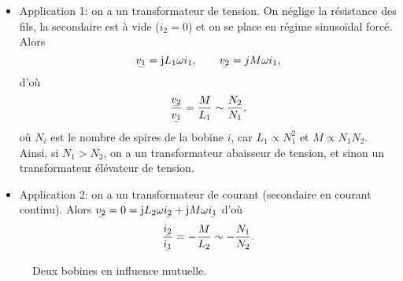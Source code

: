 \begin{itemize}
    \item Application 1: on a un transformateur de tension. On néglige la résistance des fils, la secondaire est à vide ($i_2=0$) et on se place en régime sinusoïdal forcé. Alors
    \begin{equation*}
        \ubar{v_1}=\rmj L_1\omega i_1,\qquad \ubar{v_2}=j M\omega i_1,
    \end{equation*}
    d'où
    \begin{equation*}
        \frac{\ubar{v_2}}{\ubar{v_1}}=\frac{M}{L_1}\sim\frac{N_2}{N_1},
    \end{equation*}
    où $N_i$ est le nombre de spires de la bobine $i$, car $L_1\propto N_1^{2}$ et $M\propto N_1 N_2$. Ainsi, si $N_1>N_2$, on a un transformateur abaisseur de tension, et sinon un transformateur élévateur de tension.
    \item Application 2: on a un transformateur de courant (secondaire en courant continu). Alors $\ubar{v_2}=0=\rmj L_2\omega\ubar{i_2}+\rmj M\omega\ubar{i_1}$ d'où
    \begin{equation*}
        \frac{\ubar{i_2}}{\ubar{i_1}}=-\frac{M}{L_2}\sim-\frac{N_1}{N_2}.
    \end{equation*}
\end{itemize}

\begin{figure}
    \centering
    \caption{Deux bobines en influence mutuelle.}
    \label{fig:deux_bobines_influence_mutuelle}
\end{figure}